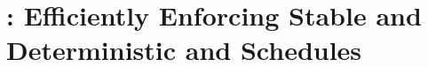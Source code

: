 
\newcommand{\bddbddb}{\v{bddbddb}\xspace}

\chapter{\peregrine: Efficiently Enforcing Stable and Deterministic and Schedules} \label{sec:peregrine}












